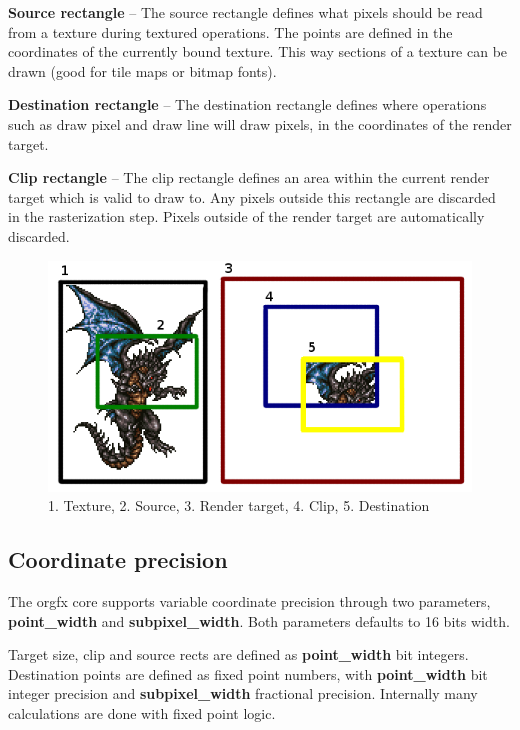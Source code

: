 \documentclass[10pt,a4paper]{article}
\begin{document}
\textbf{Source rectangle} -- The source rectangle defines what pixels should be read from a texture during textured operations. The points are defined in the coordinates of the currently bound texture. This way sections of a texture can be drawn (good for tile maps or bitmap fonts).

\textbf{Destination rectangle} -- The destination rectangle defines where operations such as draw pixel and draw line will draw pixels, in the coordinates of the render target.

\textbf{Clip rectangle} -- The clip rectangle defines an area within the current render target which is valid to draw to. Any pixels outside this rectangle are discarded in the rasterization step. Pixels outside of the render target are automatically discarded.

\begin{figure}
\begin{center}
\includegraphics[scale=0.50]{../pictures/SrcClipDest}
\caption{1. Texture, 2. Source, 3. Render target, 4. Clip, 5. Destination}
\label{fig:SrcClipDest}
\end{center}
\end{figure}

\subsection{Coordinate precision}
The orgfx core supports variable coordinate precision through two parameters, \textbf{point\_width} and \textbf{subpixel\_width}. Both parameters defaults to 16 bits width.

Target size, clip and source rects are defined as \textbf{point\_width} bit integers. Destination points are defined as fixed point numbers, with \textbf{point\_width} bit integer precision and \textbf{subpixel\_width} fractional precision. Internally many calculations are done with fixed point logic.
\end{document}
